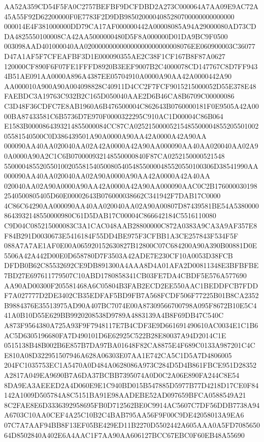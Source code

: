 \documentclass[UTF8,fontset=fandol,zihao=-4,a4paper]{ctexart}
\begin{document}
{{AA52A359CD54F5FA0C2757BEFBF9DCFDBD2A273C000064A7AA09E9AC72A45A55F92D62200000F0E7783F2D9DB9850200004085280700000000000000
000014E4F381000000DD79CA17AF000000442A00008085A94A29000080AD73CDDA4825550100008CA42AA5000000480D5F8A000000D01DA9BC9F0500
003098AAD401000040AA020000000000000000000000008076EE060900003C36077D47A1AF5F7CFEAFBF3D1E000090355AE2C38F1CF167B8F87A0627
120000CF890F6F07FE1FFFD8920B3EEF9007B2C4000078CD147767C8D7FF9434B51AE091AA0000A896A4387EE05704910A0000A90AA42A0000442A90
AA000010A900A90A004098828C40911D4CC2F7FCF9015215000052D55E378E48FAEBDC3A19763C932B2C165D050040AAE2D6B46CA8B6709C00000086
C3D48F36CDFC7E8AB1960A6B476500004C862643B0760000181F0E9505A42A0000BA87433581C6B5736D7E970F0000322295C910AC1D00004C86B064
E1583B0000864393214855000084CC87CA0252150000521548550000485520550100205581540500C0D386439501A90A0000A90AA42A0000A42A90AA
000090AA40AA020040AA02A42A0000A42A90AA000090AA40AA020040AA02A90A0000A90A2C1C6B070000932148550000840F87CA0252150000521548
55000048552055010020558154050080540548550000485520550100306D38541990AA000090AA40AA020040AA02A90A0000A90AA42A0000A42A40AA
020040AA02A90A0000A90AA42A0000A42A90AA000090AAC0C2B1760000301982540500805405D60E00002643B076000038662C341942F7DAB17C0000
4C86C64290AA000090AA40AA020040AA02A90A00807D87439581BE54A53800008643932148550000980C61D5DAB17C00004C866642184C5516110080
C9D04C085215000083C3A1CAC048AAB28800000C872A0383A9CA3A9AF357E8F84B291D0030673E5416184F55DD4BE975F3CFBB1A3CE257843F534F5F
088A7A7AE1AF0E00A065920152630827B12800C07C684200A90A390B00881D0E5506A42A442D00E0D658780D7F3503A42ADE7E230CF10A0053D38FCB
DFDB0B62C85532692CE9DB891300A4AAA8D4A01AFA2D00811348E3BFBFBE7BD27E697611779507C10ABD1780858341CB03FE7DA4CBDF5E576A577690
AA90AD00300F205581468A6C05804B3FAB2ECD2EE550AAC1BEDDFCB7FDDF7A027777D2DE3402CB35EDFAF5BD9FB7A568FCDF506F77225B01B8CA2352
B9884376E35513975AD90A407BC7074E00A87309566700798A095F8672B10E5C441A0B10D55E629BB9920208538D9789A4883139A4B8F69DB47C540C
A873F9564380A725A93F9F7948117E7B4CDF3E9D661691490610AC0034E1C1B6AC5D6305196680FA7D490101D6E62925C522B28E80037A94D2014C1E
0515138B48B002B6E857B7DA97BA01648F82CA8875E4F689C0133A987201C4CE810A08D322951507946A628A06303E07AA1E742CA5C1D5A7D4806005
204FC1035753EC1A5470A0D484A0628086A973C284D5D4B861FBCE951D28352A2817A049EA9690B7A6DA37BCBB7395074A0D0C2A06E890FA244C8E54
8DA9EA3AEEED2A4D060E9E1C940BD015B547885D5977B77D4218D17CE0F84142A1009D505784A8C5151BA91E98AADEBE52AD097659BFCA0588549A21
8C2FAE8E6D3336392958695FB0D712562BE0C9914AC5607C7DF56DDB7738A94A6703C10AA0CEF4A25C10B2C4BAB795AA56F9F00C9DE42058013A9EA6
07C7A7AAF94BB8F13EF05BE429ED11B2270D5502442A605AAA0A5FD708565064D8502840A402E6A4AAC1F7AA90AA606127BCC67EBC0F60EB48A55690
}}
\end{document}
